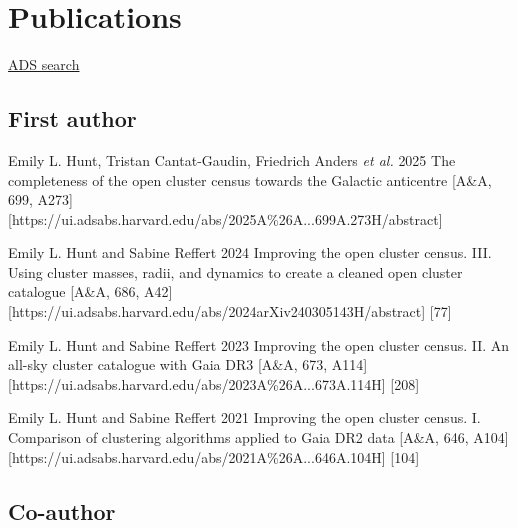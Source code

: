 \section*{Publications}

\href{\cvADSLink}{ADS search \faLink}%


\subsection*{First author}

\begin{etaremune}
    \item \publication
        {Emily L. Hunt, Tristan Cantat-Gaudin, Friedrich Anders \emph{et al.}}
        {2025}
        {The completeness of the open cluster census towards the Galactic anticentre}
        [A\&A, 699, A273]
        [https://ui.adsabs.harvard.edu/abs/2025A\%26A...699A.273H/abstract]
    \item \publication
        {Emily L. Hunt and Sabine Reffert}
        {2024}
        {Improving the open cluster census. III. Using cluster masses, radii, and dynamics to create a cleaned open cluster catalogue}
        [A\&A, 686, A42]
        [https://ui.adsabs.harvard.edu/abs/2024arXiv240305143H/abstract]
        [77]
    \item \publication
        {Emily L. Hunt and Sabine Reffert}
        {2023}
        {Improving the open cluster census. II. An all-sky cluster catalogue with Gaia DR3}
        [A\&A, 673, A114]
        [https://ui.adsabs.harvard.edu/abs/2023A\%26A...673A.114H]
        [208]
    \item \publication
        {Emily L. Hunt and Sabine Reffert}
        {2021}
        {Improving the open cluster census. I. Comparison of clustering algorithms applied to Gaia DR2 data}
        [A\&A, 646, A104]
        [https://ui.adsabs.harvard.edu/abs/2021A\%26A...646A.104H]
        [104]
\end{etaremune}


\subsection*{Co-author}

